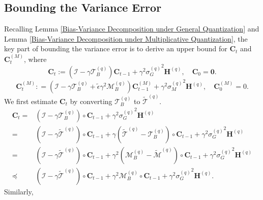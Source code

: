 \documentclass[11pt, letterpaper]{article}
\begin{document}
\subsection{Bounding the Variance Error}
\label{Bounding the Variance Error}
Recalling Lemma \ref{Bias-Variance Decomposition under General Quantization} and Lemma \ref{Bias-Variance Decomposition under Multiplicative Quantization}, the key part of bounding the variance error is to derive an upper bound for $\mathbf{C}_t$ and $\mathbf{C}_t^{(M)}$, where
\begin{equation*}
    \mathbf{C}_t := (\mathcal{I}-\gamma \mathcal{T}_B^{(q)})\mathbf{C}_{t-1}+\gamma^2 {\sigma_G^{(q)}}^2\mathbf{H}^{(q)},\quad \mathbf{C}_0=\boldsymbol{0}.
\end{equation*}
\begin{equation*}
    \mathbf{C}_t^{(M)}: = (\mathcal{I}-\gamma \mathcal{T}_B^{(q)}+\tilde{\epsilon}\gamma^2\mathcal{M}_B^{(q)})\mathbf{C}_{t-1}^{(M)}+\gamma^2 {\sigma_M^{(q)}}^2\mathbf{H}^{(q)}, \quad \mathbf{C}_0^{(M)}=0.
\end{equation*}
We first estimate $\mathbf{C}_t$ by converting $\mathcal{T}_B^{(q)}$ to $\widetilde{\mathcal{T}}^{(q)}$.
\begin{equation}
\label{initial Ct}
    \begin{aligned}
        \mathbf{C}_t=& (\mathcal{I}-\gamma\mathcal{T}_B^{(q)}) \circ \mathbf{C}_{t-1}+\gamma^2{\sigma_G^{(q)}}^2\mathbf{H}^{(q)}\\
        =&(\mathcal{I}-\gamma\widetilde{\mathcal{T}}^{(q)})\circ \mathbf{C}_{t-1}+\gamma(\widetilde{\mathcal{T}}^{(q)}-\mathcal{T}_B^{(q)})\circ \mathbf{C}_{t-1}+\gamma^2{\sigma_G^{(q)}}^2\mathbf{H}^{(q)}\\
        =&(\mathcal{I}-\gamma\widetilde{\mathcal{T}}^{(q)})\circ \mathbf{C}_{t-1}+\gamma^2(\mathcal{M}_B^{(q)}-\widetilde{\mathcal{M}}^{(q)})\circ \mathbf{C}_{t-1}+\gamma^2{\sigma_G^{(q)}}^2\mathbf{H}^{(q)}\\
        \preceq&(\mathcal{I}-\gamma\widetilde{\mathcal{T}}^{(q)})\circ \mathbf{C}_{t-1}+\gamma^2\mathcal{M}_B^{(q)}\circ \mathbf{C}_{t-1}+\gamma^2{\sigma_G^{(q)}}^2\mathbf{H}^{(q)}.
    \end{aligned}    
\end{equation}
Similarly,
\end{document}
